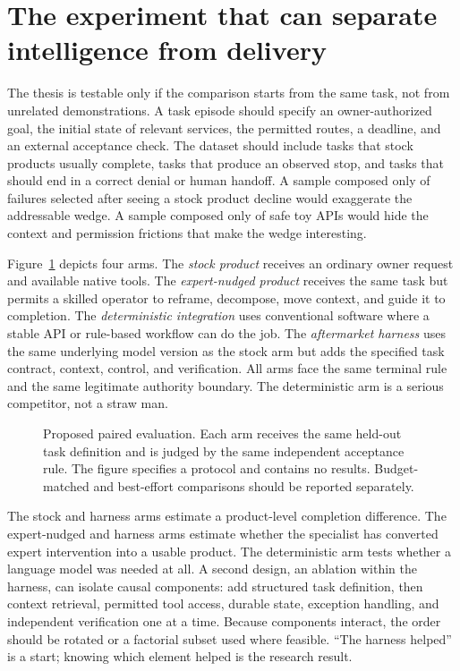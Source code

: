 \section{The experiment that can separate intelligence from delivery}

The thesis is testable only if the comparison starts from the same task, not from unrelated demonstrations. A task episode should specify an owner-authorized goal, the initial state of relevant services, the permitted routes, a deadline, and an external acceptance check. The dataset should include tasks that stock products usually complete, tasks that produce an observed stop, and tasks that should end in a correct denial or human handoff. A sample composed only of failures selected after seeing a stock product decline would exaggerate the addressable wedge. A sample composed only of safe toy APIs would hide the context and permission frictions that make the wedge interesting.

Figure~\ref{fig:paired} depicts four arms. The \emph{stock product} receives an ordinary owner request and available native tools. The \emph{expert-nudged product} receives the same task but permits a skilled operator to reframe, decompose, move context, and guide it to completion. The \emph{deterministic integration} uses conventional software where a stable API or rule-based workflow can do the job. The \emph{aftermarket harness} uses the same underlying model version as the stock arm but adds the specified task contract, context, control, and verification. All arms face the same terminal rule and the same legitimate authority boundary. The deterministic arm is a serious competitor, not a straw man.

\begin{figure}[tbp]
\centering
\caption{Proposed paired evaluation. Each arm receives the same held-out task definition and is judged by the same independent acceptance rule. The figure specifies a protocol and contains no results. Budget-matched and best-effort comparisons should be reported separately.}
\label{fig:paired}
\end{figure}

The stock and harness arms estimate a product-level completion difference. The expert-nudged and harness arms estimate whether the specialist has converted expert intervention into a usable product. The deterministic arm tests whether a language model was needed at all. A second design, an ablation within the harness, can isolate causal components: add structured task definition, then context retrieval, permitted tool access, durable state, exception handling, and independent verification one at a time. Because components interact, the order should be rotated or a factorial subset used where feasible. ``The harness helped'' is a start; knowing which element helped is the research result.

